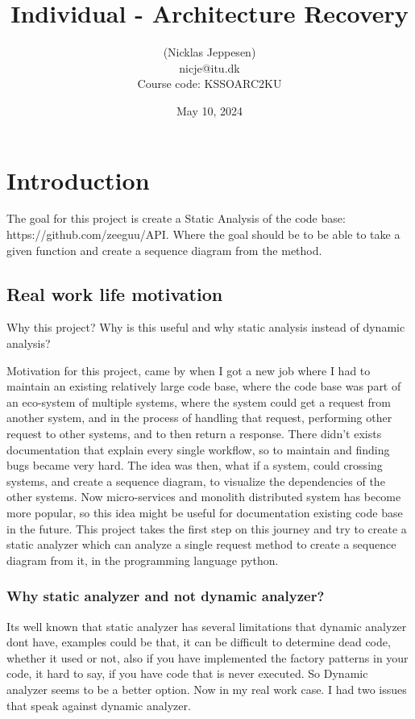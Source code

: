\documentclass[12pt,a4paper]{report}
\title{Individual - Architecture Recovery}
\author{ (Nicklas Jeppesen) \\ nicje@itu.dk \\ Course code: KSSOARC2KU}
\date{May 10, 2024}
\begin{document}
	\maketitle
    \tableofcontents

    
    
    \chapter{Introduction}
    The goal for this project is create a Static Analysis of the code base: https://github.com/zeeguu/API. 
    Where the goal should be to be able to take a given function and create a sequence diagram from the method.


    \section{Real work life motivation}
    Why this project? Why is this useful and why static analysis instead of dynamic analysis? 
    
    Motivation for this project, came by when I got a new job where I had to maintain an existing relatively large code base, where the code base was part of an eco-system of multiple systems, where the system could get a request from another system, and in the process of handling that request, performing other request to other systems, and to then return a response. There didn’t exists documentation that explain every single workflow, so to maintain and finding bugs became very hard. The idea was then, what if a system, could crossing systems, and create a sequence diagram, to visualize the dependencies of the other systems. Now micro-services and monolith distributed system has become more popular, so this idea might be useful for documentation existing code base in the future. 
    This project takes the first step on this journey and try to create a static analyzer which can analyze a single request method to create a sequence diagram from it, in the programming language python.

    \subsection*{Why static analyzer and not dynamic analyzer?}
    Its well known that static analyzer has several limitations that dynamic analyzer dont have, examples could be that, it can be difficult to determine dead code, whether it used or not, also if you have implemented the factory patterns in your code, it hard to say, if you have code that is never executed. So Dynamic analyzer seems to be a better option. Now in my real work case. I had two issues that speak against dynamic analyzer.
\end{document}
